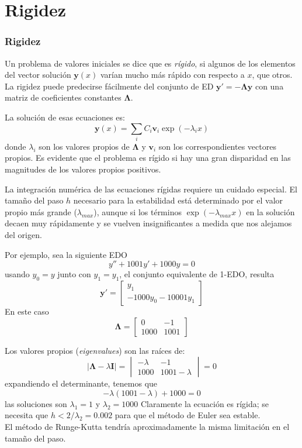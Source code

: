 \section{Rigidez}
\begin{frame}
\frametitle{Rigidez}
Un problema de valores iniciales se dice que es \emph{rígido}, si algunos de los elementos del vector solución $\mathbf{y}(x)$ varían mucho más rápido con respecto a $x$, que otros.
\\
\medskip
La rigidez puede predecirse fácilmente del conjunto de ED $\mathbf{y}' = - \mathbf{\Lambda y}$ con una matriz de coeficientes constantes $\mathbf{\Lambda}$.
\end{frame}
\begin{frame}
La solución de esas ecuaciones es:
\[ \mathbf{y}(x) = \sum_{i} C_{i} \mathbf{v}_{i} \exp(-\lambda_{i} x)\]
donde $\lambda_{i}$ son los valores propios de $\mathbf{\Lambda}$ y $\mathbf{v}_{i}$ son los correspondientes vectores propios. Es evidente que el problema es rígido si hay una gran disparidad en las magnitudes de los valores propios positivos.
\end{frame}
\begin{frame}
La integración numérica de las ecuaciones rígidas requiere un cuidado especial. El tamaño del paso $h$ necesario para la estabilidad está determinado por el valor propio más grande ($\lambda_{max}$), aunque si los términos $\exp(-\lambda_{max} x)$ en la solución decaen muy rápidamente y se vuelven insignificantes a medida que nos alejamos del origen.
\end{frame}
\begin{frame}
Por ejemplo, sea la siguiente EDO
\[ y'' + 1001 y' + 1000 y = 0 \]
usando $y_{0} = y$ junto con $y_{1} = y_{1}$, el conjunto equivalente de 1-EDO, resulta
\[ \mathbf{y}' = \begin{bmatrix}
y_{1} \\
-1000 y_{0} - 10001 y_{1}
\end{bmatrix} \]
En este caso
\[ \mathbf{\Lambda} = \begin{bmatrix}
0 & -1 \\
1000 & 1001 
\end{bmatrix}\]
\end{frame}
\begin{frame}
Los valores propios (\emph{eigenvalues}) son las raíces de:
\[ \vert \mathbf{\Lambda} - \lambda \mathbf{I} \vert = \begin{vmatrix}
- \lambda & -1 \\
1000 & 1001-\lambda
 \end{vmatrix} = 0\]
expandiendo el determinante, tenemos que
\[ - \lambda (1001 - \lambda) + 1000 = 0 \]
las soluciones son $\lambda_{1} = 1$ y $\lambda_{2} = 1000$
Claramente la ecuación es rígida; se necesita que $h < 2/\lambda_{2} = 0.002$ para que el método de Euler sea estable.
\\
\medskip
El método de Runge-Kutta tendría aproximadamente la misma limitación en el tamaño del paso.
\end{frame}
